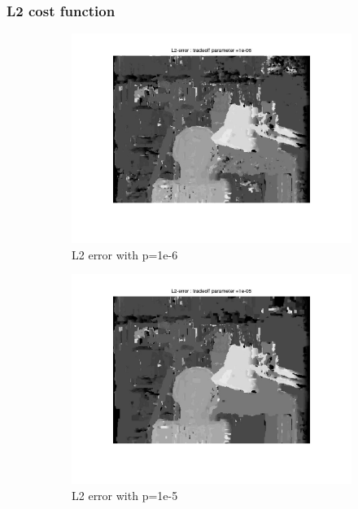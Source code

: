 \documentclass[fleqn]{article}
\begin{document}
\subsubsection{L2 cost function}
\begin{figure}[!ht]
 \begin{subfigure}{0.5\textwidth}
 \centering
\includegraphics[scale=0.2]{./pics/tsukuba_L2_error_p=1e-06.jpg}
\caption{L2 error with p=1e-6}
\end{subfigure}
 \begin{subfigure}{0.5\textwidth}
\includegraphics[scale=0.2]{./pics/tsukuba_L2_error_p=1e-05.jpg}
\caption{L2 error with p=1e-5}
\end{subfigure}
 \begin{subfigure}{0.5\textwidth}

\end{subfigure}
\end{figure}
\end{document}
